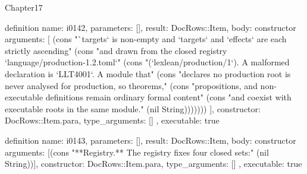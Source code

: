 \begin{lexlean}{Chapter17}
\begin{semanticmodule}
definition{
  name: i0142,
  parameters: [],
  result: DocRows::Item,
  body: constructor{
    arguments: [
      (cons "`targets` is non-empty and `targets` and `effects` are each strictly ascending" (cons "and drawn from the closed registry `language/production-1.2.toml`" (cons "(`lexlean/production/1`). A malformed declaration is `LLT4001`. A module that" (cons "declares no production root is never analysed for production, so theorems," (cons "propositions, and non-executable definitions remain ordinary formal content" (cons "and coexist with executable roots in the same module." (nil String)))))))
    ],
    constructor: DocRows::Item.para,
    type_arguments: []
  },
  executable: true
}

definition{
  name: i0143,
  parameters: [],
  result: DocRows::Item,
  body: constructor{
    arguments: [(cons "**Registry.** The registry fixes four closed sets:" (nil String))],
    constructor: DocRows::Item.para,
    type_arguments: []
  },
  executable: true
}


\end{semanticmodule}
\end{lexlean}
